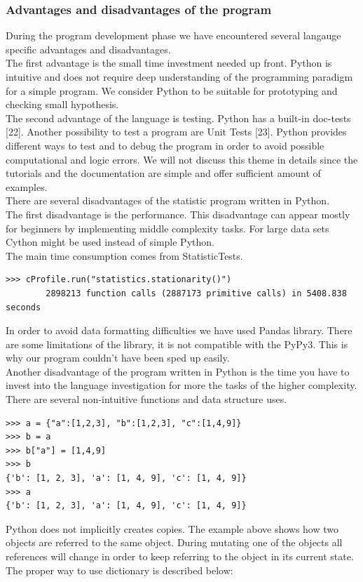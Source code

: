 \documentclass[
  twoside,
  12pt, a4paper,
  footinclude=true,
  headinclude=true,
  cleardoublepage=empty
]{article}
\begin{document}
\subsubsection{Advantages and disadvantages of the program}
During the program development phase we have encountered several langauge specific advantages and disadvantages.\\
The first advantage is the small time investment needed up front. Python is intuitive and does not require deep understanding of the programming paradigm for a simple program. We consider Python to be suitable for prototyping and checking small hypothesis.\\
The second advantage of the language is testing. Python has a built-in doc-tests [22]. Another possibility to test a program are Unit Tests [23]. Python provides different ways to test and to debug the program in order to avoid possible computational and logic errors. We will not discuss this theme in details since the tutorials and the documentation are simple and offer sufficient amount of examples.\\
There are several disadvantages of the statistic program written in Python.\\ 
The first disadvantage is the performance. This disadvantage can appear mostly for beginners by implementing middle complexity tasks. For large data sets Cython might be used instead of simple Python.\\
The main time consumption comes from StatisticTests. 
\begin{verbatim}
>>> cProfile.run("statistics.stationarity()")
        2898213 function calls (2887173 primitive calls) in 5408.838 seconds
\end{verbatim}
In order to avoid data formatting difficulties we have used Pandas library. There are some limitations of the library, it is not compatible with the PyPy3. This is why our program couldn't have been sped up easily.\\
Another disadvantage of the program written in Python is the time you have to invest into the language investigation for more the tasks of the higher complexity. There are several non-intuitive functions and data structure uses.
\begin{verbatim}
>>> a = {"a":[1,2,3], "b":[1,2,3], "c":[1,4,9]}
>>> b = a
>>> b["a"] = [1,4,9]
>>> b
{'b': [1, 2, 3], 'a': [1, 4, 9], 'c': [1, 4, 9]}
>>> a
{'b': [1, 2, 3], 'a': [1, 4, 9], 'c': [1, 4, 9]}
\end{verbatim} 
Python does not implicitly creates copies. The example above shows how two objects are referred to the same object. During mutating one of the objects all references will change in order to keep referring to the object in its current state. The proper way to use dictionary is described below:     
\end{document}
